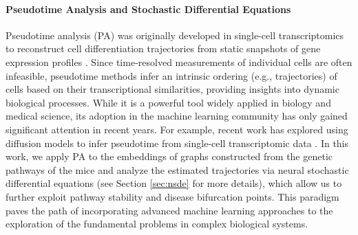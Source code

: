 \paragraph{Pseudotime Analysis and Stochastic Differential Equations}
Pseudotime analysis (PA) was originally developed in single-cell transcriptomics to reconstruct cell differentiation trajectories from static snapshots of gene expression profiles \citep{trapnell2014dynamics,haghverdi2016diffusion,wei2021dtflow}. Since time-resolved measurements of individual cells are often infeasible, pseudotime methods infer an intrinsic ordering (e.g., trajectories) of cells based on their transcriptional similarities, providing insights into dynamic biological processes. While it is a powerful tool widely applied in biology and medical science, its adoption in the machine learning community has only gained significant attention in recent years. For example, recent work has explored using diffusion models to infer pseudotime from single-cell transcriptomic data \citep{mosspseudotime}. In this work, we apply PA to the embeddings of graphs constructed from the genetic pathways of the mice and analyze the estimated trajectories via neural stochastic differential equations \citep{li2020scalable} (see Section \ref{sec:nsde} for more details), which allow us to further exploit pathway stability and disease bifurcation points. This paradigm paves the path of incorporating advanced machine learning approaches to the exploration of the fundamental problems in complex biological systems.














%